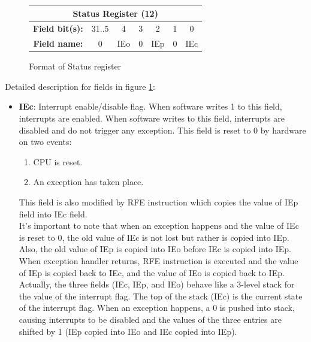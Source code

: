 \documentclass[oneside]{book}
\begin{document}
\begin{itemize}
\begin{figure}[H]
\begin{center}
\begin{tabular}{|c|c|c|c|c|c|c|}
\hline \multicolumn{7}{|c|}{Status Register (12)} \\

\hline \textbf{Field bit(s):} & 31..5 & 4   & 3 & 2   & 1 & 0  \\

\hline \textbf{Field name:}   & 0     & IEo & 0 & IEp & 0 & IEc \\

\hline

\end{tabular}

\end{center}
\caption{Format of Status register}
\label{status_reg}
\end{figure}

Detailed description for fields in figure \ref{status_reg}:

\begin{itemize}

\item \textbf{IEc}: Interrupt enable/disable flag. When software
      writes 1 to this field, interrupts are enabled. When software
      writes to this field, interrupts are disabled and do not trigger
      any exception. This field is reset to 0 by hardware on two events:

      \begin{enumerate}
      \item CPU is reset.
      \item An exception has taken place.
      \end{enumerate}

      This field is also modified by RFE instruction which copies the
      value of IEp field into IEc field.\\

      It's important to note that when an exception happens and the
      value of IEc is reset to 0, the old value of IEc is not lost
      but rather is copied into IEp. Also, the old value of IEp
      is copied into IEo before IEc is copied into IEp. When exception
      handler returns, RFE instruction is executed and the value
      of IEp is copied back to IEc, and the value of IEo is copied
      back to IEp.\\

      Actually, the three fields (IEc, IEp, and IEo) behave like
      a 3-level stack for the value of the interrupt flag. The
      top of the stack (IEc) is the current state of the interrupt
      flag. When an exception happens, a 0 is pushed into stack,
      causing interrupts to be disabled and the values of the
      three entries are shifted by 1 (IEp copied into IEo and
      IEc copied into IEp).\\


\end{itemize}
\end{itemize}
\end{document}
